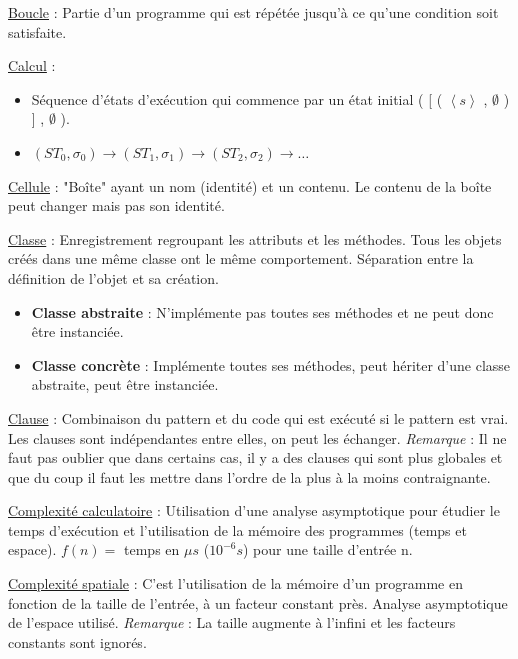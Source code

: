 \documentclass[fr,license=none,skiptoc]{../../../eplsummary}
\begin{document}
\begin{flushleft}
\textcolor{mauvedef}{\underline{Boucle}} : Partie d'un programme qui est répétée jusqu'à ce qu'une condition soit satisfaite. \bigbreak

\textcolor{mauvedef}{\underline{Calcul}} :

\begin{itemize}
\item Séquence d’états d’exécution qui commence par un état initial \textcolor{miorangerouge}{( [ ( $\left\langle s \right\rangle$ , $\emptyset$ ) ] , $\emptyset$ )}.
\item \textcolor{miorangerouge}{$ (ST_{0} , \sigma_{0}) \rightarrow (ST_{1} , \sigma_{1}) \rightarrow (ST_{2} , \sigma_{2})  \rightarrow   \ldots  $}
\end{itemize} \bigbreak


\textcolor{mauvedef}{\underline{Cellule}} : "Boîte" ayant un nom (identité) et un contenu. Le contenu de la boîte peut changer mais pas son identité. \bigbreak


\textcolor{mauvedef}{\underline{Classe}} : Enregistrement regroupant les attributs et les méthodes. Tous les objets créés dans une même classe ont le même comportement. Séparation entre la définition de l'objet et sa création.
	
\begin{itemize}
\item \textbf{Classe abstraite} : N'implémente pas toutes ses méthodes et ne peut donc être instanciée.
\item \textbf{Classe concrète} : Implémente toutes ses méthodes, peut hériter d’une classe abstraite, peut être instanciée.
\end{itemize}
\bigbreak


\textcolor{mauvedef}{\underline{Clause}} : Combinaison du pattern et du code qui est exécuté si le pattern est vrai. Les clauses sont indépendantes entre elles, on peut les échanger. \textit{Remarque} : Il ne faut pas oublier que dans certains cas, il y a des clauses qui sont plus globales et que du coup il faut les mettre dans l'ordre de la plus à la moins contraignante. \bigbreak


\textcolor{mauvedef}{\underline{Complexité calculatoire}} : Utilisation d'une analyse asymptotique pour étudier le temps d'exécution et l'utilisation de la mémoire des programmes (temps et espace). $f(n) =$ temps en $\mu s$ ($10^{-6} s$) pour une taille d'entrée n.
\bigbreak


\textcolor{mauvedef}{\underline{Complexité spatiale}} : C’est l'utilisation de la mémoire d’un programme en fonction de la taille de l’entrée, à un facteur constant près. Analyse asymptotique de l'espace utilisé. \textit{Remarque} : La taille augmente à l'infini et les facteurs constants sont ignorés.


\end{flushleft}
\end{document}

